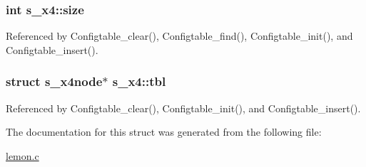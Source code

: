 \hypertarget{structs__x4_a9438094aabcc61974b103715c633e76a}{
\subsubsection[{size}]{\setlength{\rightskip}{0pt plus 5cm}int s\-\_\-x4\-::size}}\label{structs__x4_a9438094aabcc61974b103715c633e76a}


Referenced by Configtable\-\_\-clear(), Configtable\-\_\-find(), Configtable\-\_\-init(), and Configtable\-\_\-insert().

\hypertarget{structs__x4_aebad5c8178977d983aa7f24bf46be059}{
\subsubsection[{tbl}]{\setlength{\rightskip}{0pt plus 5cm}struct {\bf s\-\_\-x4node}$\ast$ s\-\_\-x4\-::tbl}}\label{structs__x4_aebad5c8178977d983aa7f24bf46be059}


Referenced by Configtable\-\_\-clear(), Configtable\-\_\-init(), and Configtable\-\_\-insert().



The documentation for this struct was generated from the following file\-:\begin{DoxyCompactItemize}
\item 
\hyperlink{lemon_8c}{lemon.\-c}\end{DoxyCompactItemize}
